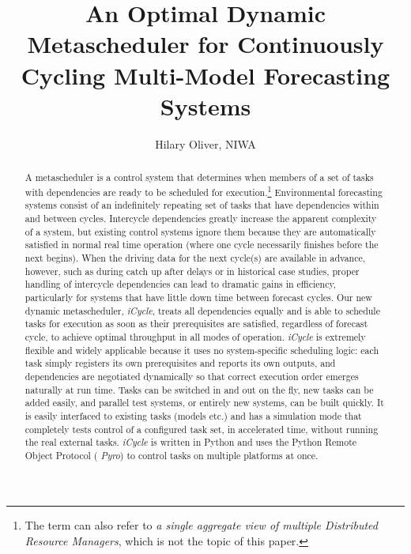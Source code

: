 \documentclass[11pt,a4paper]{article}
\title{An Optimal Dynamic Metascheduler for Continuously Cycling
Multi-Model Forecasting Systems}
\author{Hilary Oliver, NIWA}
\begin{document}
\maketitle

\begin{abstract}

    A metascheduler is a control system that determines when members of
    a set of tasks with dependencies are ready to be scheduled for
    execution.\footnote{The term can also refer to {\it a single
    aggregate view of multiple Distributed Resource Managers}, which is
    not the topic of this paper.}  Environmental forecasting systems
    consist of an indefinitely repeating set of tasks that have
    dependencies within and between cycles. Intercycle dependencies
    greatly increase the apparent complexity of a system, but existing
    control systems ignore them because they are automatically satisfied
    in normal real time operation (where one cycle necessarily finishes
    before the next begins).  When the driving data for the next
    cycle(s) are available in advance, however, such as during catch up
    after delays or in historical case studies, proper handling of
    intercycle dependencies can lead to dramatic gains in efficiency,
    particularly for systems that have little down time between forecast
    cycles.  Our new dynamic metascheduler, {\em iCycle}, treats all
    dependencies equally and is able to schedule tasks for execution as
    soon as their prerequisites are satisfied, regardless of forecast
    cycle, to achieve optimal throughput in all modes of operation. {\em
    iCycle} is extremely flexible and widely applicable because it uses
    no system-specific scheduling logic: each task simply registers its
    own prerequisites and reports its own outputs, and dependencies are
    negotiated dynamically so that correct execution order emerges
    naturally at run time.  Tasks can be switched in and out on the fly,
    new tasks can be added easily, and parallel test systems, or
    entirely new systems, can be built quickly. It is easily interfaced
    to existing tasks (models etc.) and has a simulation mode that
    completely tests control of a configured task set, in accelerated
    time, without running the real external tasks. {\em iCycle} is
    written in Python and uses the Python Remote Object Protocol ({\em
    Pyro}) to control tasks on multiple platforms at once. 

\end{abstract}

\pagebreak
\tableofcontents
\pagebreak
\end{document}
